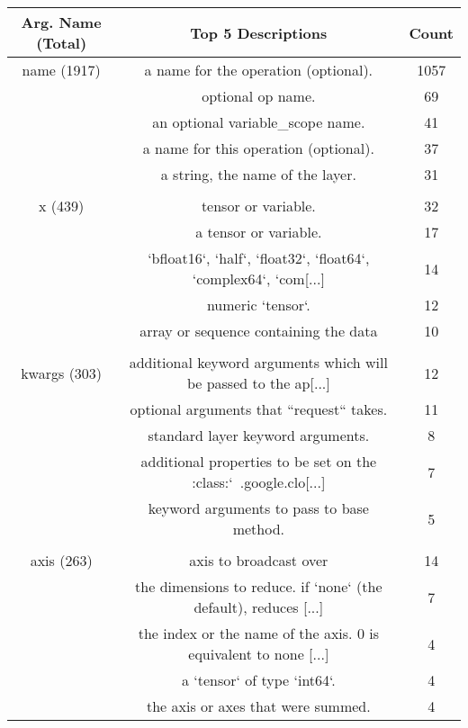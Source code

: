 \begin{table}[h]
    \begin{center}
    \begin{tabular}{c | c | c }       
 Arg. Name (Total) & Top 5 Descriptions & Count\\
\hline
name   (1917) &  a name for the operation (optional).                                & 1057\\
&  optional op name.                                                   & 69 \\
&  an optional variable\_scope name.                                    & 41 \\
&  a name for this operation (optional).                               & 37 \\
&  a string, the name of the layer.                                    & 31 \\

\\
\hline
x   (439) &  tensor or variable.                                                 & 32 \\
&  a tensor or variable.                                               & 17 \\
&  `bfloat16`, `half`, `float32`, `float64`, `complex64`, `com[...]   & 14 \\
&  numeric `tensor`.                                                   & 12 \\
&  array or sequence containing the data                               & 10 \\

 \\
\hline
kwargs   (303) &  additional keyword arguments which will be passed to the ap[...]   & 12 \\
& optional arguments that ``request`` takes.                          & 11 \\
& standard layer keyword arguments.                                   & 8 \\
& additional properties to be set on the :class:`~.google.clo[...]   & 7 \\
& keyword arguments to pass to base method.                           & 5 \\

\\
\hline
axis   (263)  &  axis to broadcast over                                              & 14 \\
& the dimensions to reduce. if `none` (the default), reduces [...]   & 7 \\
& the index or the name of the axis. 0 is equivalent to none [...]   & 4 \\
& a `tensor` of type `int64`.                                         & 4 \\
& the axis or axes that were summed.                                  & 4 \\


\end{tabular}
\end{center}
\end{table}
